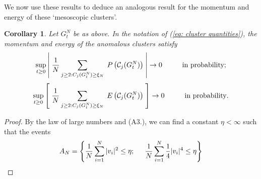 \documentclass[11pt, notitlepage]{article}
\newtheorem{cor}[thm]{Corollary}
\begin{document}
We now use these results to deduce an analogous result for the momentum and energy of these `mesoscopic clusters'. \begin{cor}\label{corr: anomalous clusters 3}  Let $G^N_t$ be as above. In the notation of (\ref{eq: cluster quantities}), the momentum and energy of the anomalous clusters satisfy \begin{equation}
           \sup_{t\ge 0} \left|\hspace{0.1cm}\frac{1}{N}\sum_{j\ge 2: C_j(G^N_t)\ge \xi_N} \hspace{0.1cm} P\left(\mathcal{C}_j(G^N_t)\right) \hspace{0.1cm}\right| \rightarrow 0 \hspace{1cm} \text{in probability};
       \end{equation} \begin{equation}
           \sup_{t\ge 0} \left[\hspace{0.1cm}\frac{1}{N}\sum_{j\ge 2: C_j(G^N_t)\ge \xi_N} \hspace{0.1cm} E\left(\mathcal{C}_j(G^N_t)\right) \hspace{0.1cm}\right] \rightarrow 0 \hspace{1cm} \text{in probability}.
       \end{equation}   \end{cor} \begin{proof} By the law of large numbers and (A3.), we can find a constant $\eta<\infty$ such that the events \begin{equation}
        A_N =\left\{\frac{1}{N}\sum_{i=1}^N |v_i|^2 \le \eta;\hspace{0.5cm} \frac{1}{N}\sum_{i=1}^N \frac{1}{4}|v_i|^4\le \eta\right\}

\end{equation}
\end{proof}
\end{document}
